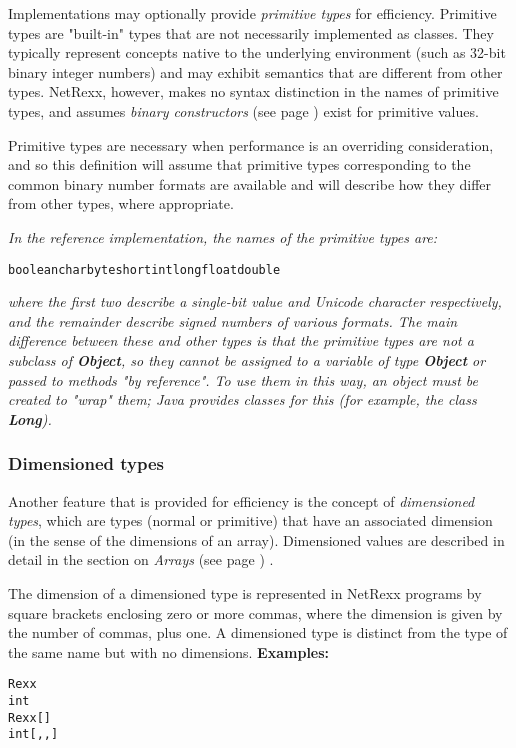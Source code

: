 Implementations may optionally provide \emph{primitive types} for
efficiency.
Primitive types are "built-in" types that are not necessarily
implemented as classes.
They typically represent concepts native to the underlying environment
(such as 32-bit binary integer numbers) and may exhibit semantics that
are different from other types.  NetRexx, however, makes no syntax
distinction in the names of primitive types, and assumes
 \emph{binary constructors} (see page \pageref{refbincon})  exist for primitive
values.
 
Primitive types are necessary when performance is an overriding
consideration, and so this definition will assume that primitive types
corresponding to the common binary number formats are available and will
describe how they differ from other types, where appropriate.
 
\emph{In the reference implementation, the names of the primitive types
are:}
\begin{alltt}
boolean char byte short int long float double
\end{alltt}
\emph{where the first two describe a single-bit value and Unicode
character respectively, and the remainder describe signed numbers of
various formats.
The main difference between these and other types is that the primitive
types are not a subclass of \textbf{Object}, so they cannot be
assigned to a variable of type \textbf{Object} or passed to methods
"by reference".  To use them in this way, an object must be created
to "wrap" them; Java provides classes for this (for example, the
class \textbf{Long}).
}
\subsubsection{Dimensioned types}\label{"id"}
 
Another feature that is provided for efficiency is the concept of
\emph{dimensioned types}, which are types (normal or primitive) that
have an associated dimension (in the sense of the dimensions of an
array).  Dimensioned values are described in detail in the section on
 \emph{Arrays} (see page \pageref{refarray}) .
 
The dimension of a dimensioned type is represented in NetRexx programs
by square brackets enclosing zero or more commas, where the dimension is
given by the number of commas, plus one.  A dimensioned type is distinct
from the type of the same name but with no dimensions.
 \textbf{Examples:}
\begin{alltt}
Rexx
int
Rexx[]
int[,,]
\end{alltt}

